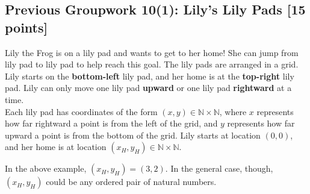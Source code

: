 \documentclass[12pt]{exam}
\begin{document}
\subsection*{Previous Groupwork 10(1): Lily's Lily Pads [15 points]}
Lily the Frog is on a lily pad and wants to get to her home! She can jump from lily pad to lily pad to help reach this goal. The lily pads are arranged in a grid. Lily starts on the \textbf{bottom-left} lily pad, and her home is at the \textbf{top-right} lily pad. Lily can only move one lily pad \textbf{upward} or one lily pad \textbf{rightward} at a time.\\

Each lily pad has coordinates of the form $(x, y) \in \mathbb{N} \times \mathbb{N}$, where $x$ represents how far rightward a point is from the left of the grid, and $y$ represents how far upward a point is from the bottom of the grid. Lily starts at location $(0, 0)$, and her home is at location $(x_H, y_H)  \in \mathbb{N} \times \mathbb{N}$.\\

\begin{center}
\end{center}

In the above example, $(x_H, y_H) = (3, 2)$. In the general case, though, $(x_H, y_H)$ could be any ordered pair of natural numbers.
\end{document}
